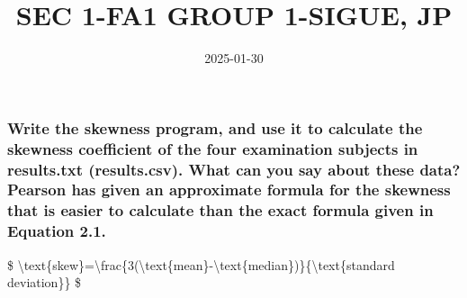 \documentclass[
]{article}
\title{SEC 1-FA1 GROUP 1-SIGUE, JP}
\author{}
\date{\vspace{-2.5em}2025-01-30}
\begin{document}
\maketitle

\subsubsection{Write the skewness program, and use it to calculate the
skewness coefficient of the four examination subjects in results.txt
(results.csv). What can you say about these data? Pearson has given an
approximate formula for the skewness that is easier to calculate than
the exact formula given in Equation
2.1.}\label{write-the-skewness-program-and-use-it-to-calculate-the-skewness-coefficient-of-the-four-examination-subjects-in-results.txt-results.csv.-what-can-you-say-about-these-data-pearson-has-given-an-approximate-formula-for-the-skewness-that-is-easier-to-calculate-than-the-exact-formula-given-in-equation-2.1.}

\$
\textbackslash text\{skew\}=\textbackslash frac\{3(\textbackslash text\{mean\}-\textbackslash text\{median\})\}\{\textbackslash text\{standard
deviation\}\} \$
\end{document}
